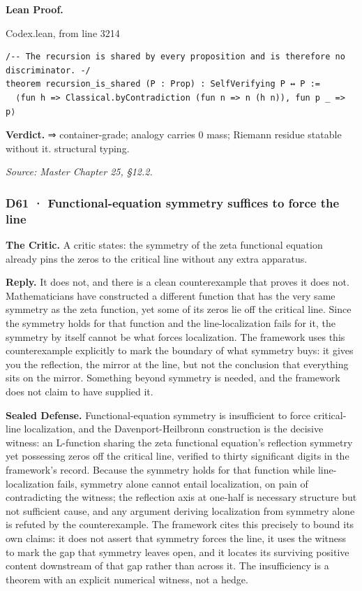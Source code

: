 \documentclass[10pt,twocolumn]{article}
\begin{document}
\textbf{Lean Proof.}

\begin{leanexcerpt}{Codex.lean, from line 3214}
\begin{lstlisting}[style=leanx,firstnumber=3214]
/-- The recursion is shared by every proposition and is therefore no discriminator. -/
theorem recursion_is_shared (P : Prop) : SelfVerifying P ↔ P :=
  ⟨fun h => Classical.byContradiction (fun n => n (h n)), fun p _ => p⟩
\end{lstlisting}
\end{leanexcerpt}

\textbf{Verdict.} ⇒ container-grade; analogy carries 0 mass; Riemann
residue statable without it. structural typing.

\emph{Source: Master Chapter 25, §12.2.}

\hypertarget{d61-functional-equation-symmetry-suffices-to-force-the-line}{%
\subsubsection{D61 · Functional-equation symmetry suffices to force the
line}\label{d61-functional-equation-symmetry-suffices-to-force-the-line}}

\textbf{The Critic.} A critic states: the symmetry of the zeta
functional equation already pins the zeros to the critical line without
any extra apparatus.

\textbf{Reply.} It does not, and there is a clean counterexample that
proves it does not. Mathematicians have constructed a different function
that has the very same symmetry as the zeta function, yet some of its
zeros lie off the critical line. Since the symmetry holds for that
function and the line-localization fails for it, the symmetry by itself
cannot be what forces localization. The framework uses this
counterexample explicitly to mark the boundary of what symmetry buys: it
gives you the reflection, the mirror at the line, but not the conclusion
that everything sits on the mirror. Something beyond symmetry is needed,
and the framework does not claim to have supplied it.

\textbf{Sealed Defense.} Functional-equation symmetry is insufficient to
force critical-line localization, and the Davenport-Heilbronn
construction is the decisive witness: an L-function sharing the zeta
functional equation's reflection symmetry yet possessing zeros off the
critical line, verified to thirty significant digits in the framework's
record. Because the symmetry holds for that function while
line-localization fails, symmetry alone cannot entail localization, on
pain of contradicting the witness; the reflection axis at one-half is
necessary structure but not sufficient cause, and any argument deriving
localization from symmetry alone is refuted by the counterexample. The
framework cites this precisely to bound its own claims: it does not
assert that symmetry forces the line, it uses the witness to mark the
gap that symmetry leaves open, and it locates its surviving positive
content downstream of that gap rather than across it. The insufficiency
is a theorem with an explicit numerical witness, not a hedge.
\end{document}
